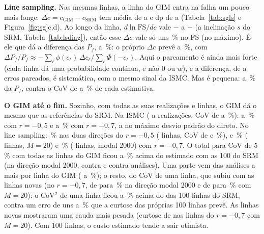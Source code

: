 \documentclass[11pt,a4paper]{article}
\begin{document}
\textbf{Line sampling.} Nas mesmas \sglN{} linhas, a linha do GIM entra na falha um pouco mais longe:
$\Delta c = c_\text{GIM} - c_\text{SRM}$ tem média de \sglDcMin{} a \sglDcMax{} e dp de \sglDcSdMin{} a \sglDcSdMax{}
(Tabela~\ref{tab:sgls} e Figura~\ref{fig:sg}c,d). Ao longo da linha, $d\ln\mathrm{FS}/dc$ vale $-$\sglSmin{} a
$-$\sglSmax{} (a inclinação $s$ do SRM, Tabela~\ref{tab:lsdiag}), então esse $\Delta c$ vale só uns \sglDfs\,\% no
FS (no máximo). É ele que dá a diferença das $P_f$, \sglDifMin{} a \sglDifMax\,\%: o próprio $\Delta c$ prevê
\sglPrevMin{} a
\sglPrevMax\,\%, com $\Delta P_f/P_f \approx -\sum_\ell \phi(c_\ell)\,\Delta c_\ell / \sum_\ell \Phi(-c_\ell)$. Aqui o
pareamento é ainda mais forte (cada linha dá uma probabilidade contínua, e não 0 ou $w$), e a diferença, de \sglZmin{} a
\sglZmax{} erros pareados, é sistemática, com o mesmo sinal da ISMC. Mas é pequena: \sglDifMin{} a \sglDifMax\,\% da
$P_f$, contra o CoV de \sglCovMin{} a \sglCovMax\,\% de cada estimativa.

\textbf{O GIM até o fim.} Sozinho, com todas as suas realizações e linhas, o GIM dá o mesmo que as referências do SRM.
Na ISMC (\sgGaNmin{} a \sgGaNmax{} realizações, CoV de \sgGaCovRaMin{} a \sgGaCovRbMax\,\%): \sgGaRaMin{} a
\sgGaRaMax\,\% com $r = -0{,}5$ e \sgGaRbMin{} a \sgGaRbMax\,\% com $r = -0{,}7$, a no máximo \sgGaZMax{} desvio
padrão do direto. No line sampling: \sglGaPfRaMv\,\% nas duas direções do $r = -0{,}5$ (\sglGaNRaMv{} linhas, CoV de
\sglGaCovRaGm{} e \sglGaCovRaMv\,\%), e \sglGaPfRbMv\,\% (\sglGaNRbMv{} linhas, $M = 20$) e \sglGaPfRbGm\,\%
(\sglGaNRbGm{} linhas, modal 2000) com $r = -0{,}7$. O total para CoV de 5\,\% com todas as linhas do GIM ficou
\sglGaCustoMin{} a \sglGaCustoMax\,\% acima do estimado com as 100 do SRM (na direção modal 2000, \sglGaNcRaGm{} contra
\sglSNcRaGm{} e \sglGaNcRbGm{} contra \sglSNcRbGm{} análises). Uma parte vem das análises a mais por linha do GIM
(\sglNaRazMin{} a \sglNaRazMax\,\%); o resto, do CoV de uma linha, que subiu com as linhas novas (no $r = -0{,}7$, de
\sglClRbGmCem{} para \sglClRbGmTodas\,\% na direção modal 2000 e de \sglClRbMvCem{} para \sglClRbMvTodas\,\% com
$M = 20$): o CoV$^2$ de uma linha ficou \sglCovDoisMin{} a \sglCovDoisMax\,\% acima do das 100 linhas do SRM, contra
um erro de uns \sglCurtErrMin{} a \sglCurtErrMax\,\% que a curtose das próprias 100 linhas prevê. As linhas novas
mostraram uma cauda mais pesada (curtose de \sglCurtRbMvTodas{} nas \sglGaNRbMv{} linhas do $r = -0{,}7$ com $M = 20$).
Com 100 linhas, o custo estimado tende a sair otimista.
\end{document}
